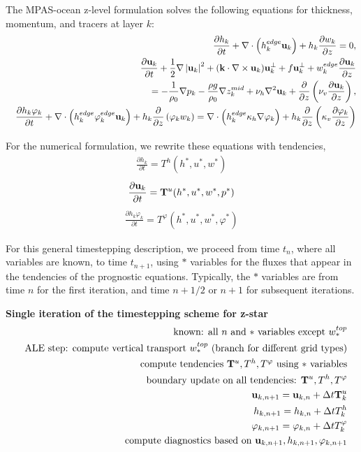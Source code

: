 \documentclass[11pt]{report}
\newcommand{\ds}{\displaystyle}
\newcommand{\bea}{\begin{eqnarray}}
\newcommand{\eea}{\end{eqnarray}}
\begin{document}
The MPAS-ocean z-level formulation solves the following equations for thickness, momentum, and tracers at layer $k$:
\begin{eqnarray}   
&&\label{h1} \ds
\frac{\partial h_k}{\partial t} 
 + \nabla \cdot \left( h_k^{edge} {\bf u}_k \right) 
 + h_k  \frac{\partial w_k}{\partial z} = 0,
\\&&
\label{u1} \ds
\frac{\partial {\bf u}_k}{\partial t} 
+ \frac{1}{2}\nabla \left| {\bf u}_k \right|^2 
+ ( {\bf k} \cdot \nabla \times {\bf u}_k) {\bf u}^\perp_k 
+ f{\bf u}^{\perp}_k 
+ w_k^{edge}\frac{\partial {\bf u}_k}{\partial z} \nonumber \\ &&\hspace{2cm} 
  = - \frac{1}{\rho_0}\nabla p_k  - \frac{\rho g}{\rho_0}\nabla z^{mid}_k
   +\nu_h\nabla^2{\bf u}_k
 + \frac{\partial }{\partial z} 
\left( \nu_v \frac{\partial {\bf u}_k}{\partial z} \right),
\\
&&\label{continuous_tracer1} \ds
\frac{\partial h_k\varphi_k}{\partial t} 
 + \nabla \cdot \left( h_k^{edge}\varphi_k^{edge} {\bf u}_k \right) 
  + h_k \frac{\partial}{\partial z} \left( \varphi_k w_k \right) 
= \nabla\cdot\left(h_k^{edge} \kappa_h \nabla\varphi_k \right)
+ h_k \frac{\partial }{\partial z} 
  \left( \kappa_v \frac{\partial \varphi_k}{\partial z} \right)
\end{eqnarray}

For the numerical formulation, we rewrite these equations with tendencies,
\bea
\label{h1t} \ds
\frac{\partial h_k}{\partial t} = T^h(h^*, u^*, w^*)
\eea
\bea
\label{u1t} \ds
\frac{\partial {\bf u}_k}{\partial t} = {\bf T}^u(h^*, u^*, w^*, p^*)
\eea
\bea
\label{continuous_tracer1t} \ds
\frac{\partial h_k\varphi_k}{\partial t} = T^\varphi(h^*, u^*, w^*, \varphi^*)
\eea

For this general timestepping description, we proceed from time $t_n$, where all variables are known, to time $t_{n+1}$, using $*$ variables for the fluxes that appear in the tendencies of the prognostic equations.  Typically, the $*$ variables are from time $n$ for the first iteration, and time $n+1/2$ or $n+1$ for subsequent iterations.

{\bf Single iteration of the timestepping scheme for z-star}
\begin{eqnarray} &&
\mbox{known: all $n$ and $*$ variables except $w^{top}_*$}\\&&
\mbox{ALE step: compute vertical transport $w^{top}_*$} 
\mbox{ (branch for different grid types)}\\ && 
\mbox{compute tendencies ${\bf T}^u, T^h, T^\varphi $ using $*$ variables}\\ && 
\mbox{boundary update on all tendencies: } {\bf T}^u,T^h,T^\varphi\\&& 
{\bf u}_{k,n+1} = {\bf u}_{k,n} + \Delta t {\bf T}^u_k \\&& 
h_{k,n+1} = h_{k,n} + \Delta t T^h_k \\&& 
{\varphi}_{k,n+1} =  \varphi_{k,n} + \Delta t  T^\varphi_k \\&&
\mbox{compute diagnostics based on }{\bf u}_{k,n+1},h_{k,n+1},\varphi_{k,n+1} 
\end{eqnarray}
\end{document}
